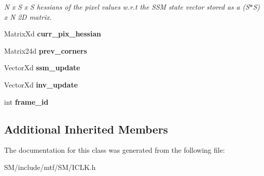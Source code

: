 \begin{DoxyCompactItemize}
\begin{DoxyCompactList}\small\item\em N x S x S hessians of the pixel values w.\-r.\-t the S\-S\-M state vector stored as a (S$\ast$\-S) x N 2\-D matrix. \end{DoxyCompactList}\item 
\hypertarget{classICLK_acf2fed0787c9f2128a6ecdaa6a39866c}{Matrix\-Xd {\bfseries curr\-\_\-pix\-\_\-hessian}}\label{classICLK_acf2fed0787c9f2128a6ecdaa6a39866c}

\item 
\hypertarget{classICLK_a1abdd3bba3f87338dba1bc225fd33229}{Matrix24d {\bfseries prev\-\_\-corners}}\label{classICLK_a1abdd3bba3f87338dba1bc225fd33229}

\item 
\hypertarget{classICLK_a6cda93b3ed854937a169a619a4949958}{Vector\-Xd {\bfseries ssm\-\_\-update}}\label{classICLK_a6cda93b3ed854937a169a619a4949958}

\item 
\hypertarget{classICLK_a85a1b1c824bc5af2f2ccda32d7d9f5b6}{Vector\-Xd {\bfseries inv\-\_\-update}}\label{classICLK_a85a1b1c824bc5af2f2ccda32d7d9f5b6}

\item 
\hypertarget{classICLK_a309c08fe9ddf14a34480382d276cda32}{int {\bfseries frame\-\_\-id}}\label{classICLK_a309c08fe9ddf14a34480382d276cda32}

\end{DoxyCompactItemize}
\subsection*{Additional Inherited Members}


The documentation for this class was generated from the following file\-:\begin{DoxyCompactItemize}
\item 
S\-M/include/mtf/\-S\-M/I\-C\-L\-K.\-h\end{DoxyCompactItemize}
